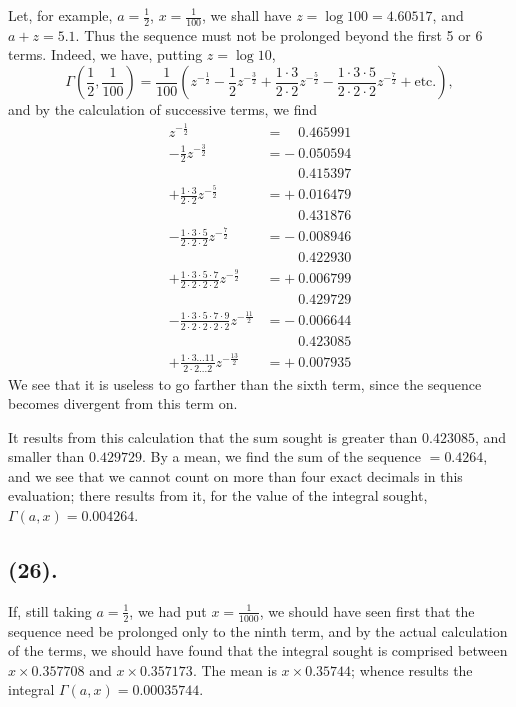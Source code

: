 \documentclass{article}
\begin{document}
Let, for example, $a=\frac{1}{2}$, $x=\frac{1}{100}$, we shall have $z=\log 100=4.60517$, and $a+z=5.1$. Thus the sequence must not be prolonged beyond the first 5 or 6 terms. Indeed, we have, putting $z=\log 10$,
\[ \Gamma\left(\frac{1}{2},\frac{1}{100}\right)=\frac{1}{100}\left(z^{-\frac{1}{2}}-\frac{1}{2}z^{-\frac{3}{2}}+\frac{1\cdot3}{2\cdot2}z^{-\frac{5}{2}}-\frac{1\cdot3\cdot5}{2\cdot2\cdot2}z^{-\frac{7}{2}}+\text{etc.}\right), \]
and by the calculation of successive terms, we find
\[ \begin{aligned} z^{-\frac{1}{2}}&=\phantom{+\ }0.465991\\ -\frac{1}{2}z^{-\frac{3}{2}}&=-\ 0.050594\\ &\phantom{=+\ }0.415397\\ +\frac{1\cdot3}{2\cdot2}z^{-\frac{5}{2}}&=+\ 0.016479\\ &\phantom{=+\ }0.431876\\ -\frac{1\cdot3\cdot5}{2\cdot2\cdot2}z^{-\frac{7}{2}}&=-\ 0.008946\\ &\phantom{=+\ }0.422930\\ +\frac{1\cdot3\cdot5\cdot7}{2\cdot2\cdot2\cdot2}z^{-\frac{9}{2}}&=+\ 0.006799\\ &\phantom{=+\ }0.429729\\ -\frac{1\cdot3\cdot5\cdot7\cdot9}{2\cdot2\cdot2\cdot2\cdot2}z^{-\frac{11}{2}}&=-\ 0.006644\\ &\phantom{=+\ }0.423085\\ +\frac{1\cdot3\ldots11}{2\cdot2\ldots2}z^{-\frac{13}{2}}&=+\ 0.007935 \end{aligned} \]
We see that it is useless to go farther than the sixth term, since the sequence becomes divergent from this term on.

It results from this calculation that the sum sought is greater than $0.423085$, and smaller than $0.429729$. By a mean, we find the sum of the sequence $=0.4264$, and we see that we cannot count on more than four exact decimals in this evaluation; there results from it, for the value of the integral sought, $\Gamma(a,x)=0.004264$.

\subsection*{(26).}

If, still taking $a=\frac{1}{2}$, we had put $x=\frac{1}{1000}$, we should have seen first that the sequence need be prolonged only to the ninth term, and by the actual calculation of the terms, we should have found that the integral sought is comprised between $x\times0.357708$ and $x\times0.357173$. The mean is $x\times0.35744$; whence results the integral $\Gamma(a,x)=0.00035744$.
\end{document}
